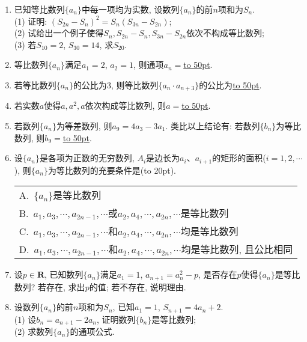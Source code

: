 \documentclass[10pt,a4paper]{article}
\newcommand{\blank}[1]{\underline{\hbox to #1pt{}}}
\newcommand{\bracket}[1]{(\hbox to #1pt{})}
\newcommand{\onech}[4]{\par\begin{tabular}{p{.9\textwidth}}
A.~#1\\
B.~#2\\
C.~#3\\
D.~#4
\end{tabular}}
\begin{document}
\begin{enumerate}[1.]
\item 已知等比数列$\{a_n\}$中每一项均为实数, 设数列$\{a_n\}$的前$n$项和为$S_n$.\\
(1) 证明: $(S_{2n}-S_n)^2=S_n(S_{3n}-S_{2n})$;\\
(2) 试给出一个例子使得$S_n,S_{2n}-S_n,S_{3n}-S_{2n}$依次不构成等比数列;\\
(3) 若$S_{10}=2$, $S_{30}=14$, 求$S_{20}$.
\item 等比数列$\{a_n\}$满足$a_1=2$, $a_2=1$, 则通项$a_n=$\blank{50}.
\item 若等比数列$\{a_n\}$的公比为$3$, 则等比数列$\{a_n\cdot a_{n+3}\}$的公比为\blank{50}.
\item 若实数$a$使得$a,a^2,a$依次构成等比数列, 则$a=$\blank{50}.
\item 若数列$\{a_n\}$为等差数列, 则$a_9=4a_3-3a_1$. 类比以上结论有: 若数列$\{b_n\}$为等比数列, 则$b_9=$\blank{50}.
\item 设$\{a_n\}$是各项为正数的无穷数列, $A_i$是边长为$a_i$、$a_{i+1}$的矩形的面积($i=1,2,\cdots$), 则$\{a_n\}$为等比数列的充要条件是\bracket{20}.
\onech{$\{a_n\}$是等比数列}{$a_1,a_3,\cdots,a_{2n-1},\cdots$或$a_2,a_4,\cdots,a_{2n},\cdots$是等比数列}{$a_1,a_3,\cdots,a_{2n-1},\cdots$和$a_2,a_4,\cdots,a_{2n},\cdots$均是等比数列}{$a_1,a_3,\cdots,a_{2n-1},\cdots$和$a_2,a_4,\cdots,a_{2n},\cdots$均是等比数列, 且公比相同}
\item 设$p\in \mathbf{R}$, 已知数列$\{a_n\}$满足$a_1=1$, $a_{n+1}=a_n^2-p$, 是否存在$p$使得$\{a_n\}$是等比数列? 若存在, 求出$p$的值; 若不存在, 说明理由.
\item 设数列$\{a_n\}$的前$n$项和为$S_n$, 已知$a_1=1$, $S_{n+1}=4a_n+2$.\\
(1) 设$b_n=a_{n+1}-2a_n$, 证明数列$\{b_n\}$是等比数列;\\
(2) 求数列$\{a_n\}$的通项公式.





\end{enumerate}
\end{document}
